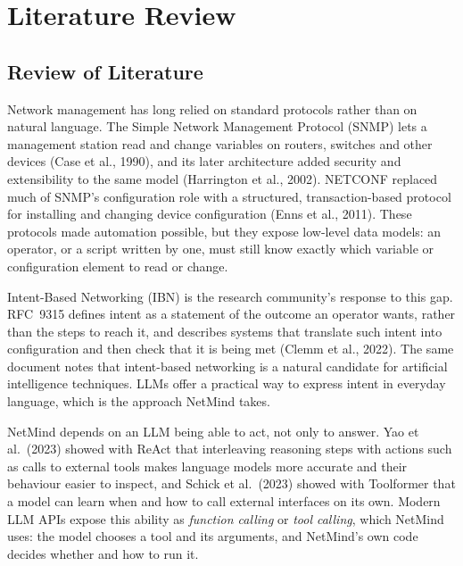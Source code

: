 \chapter{Literature Review}

\section{Review of Literature}


Network management has long relied on standard protocols rather than on
natural language. The Simple Network Management Protocol (SNMP) lets a
management station read and change variables on routers, switches and other
devices (Case et al., 1990), and its later architecture added security and
extensibility to the same model (Harrington et al., 2002). NETCONF replaced
much of SNMP's configuration role with a structured, transaction-based
protocol for installing and changing device configuration (Enns et al.,
2011). These protocols made automation possible, but they expose low-level
data models: an operator, or a script written by one, must still know
exactly which variable or configuration element to read or change.

Intent-Based Networking (IBN) is the research community's response to this
gap. RFC~9315 defines intent as a statement of the outcome an operator
wants, rather than the steps to reach it, and describes systems that
translate such intent into configuration and then check that it is being met
(Clemm et al., 2022). The same document notes that intent-based networking is
a natural candidate for artificial intelligence techniques. LLMs offer a
practical way to express intent in everyday language, which is the approach
NetMind takes.


NetMind depends on an LLM being able to act, not only to answer. Yao et al.\
(2023) showed with ReAct that interleaving reasoning steps with actions such
as calls to external tools makes language models more accurate and their
behaviour easier to inspect, and Schick et al.\ (2023) showed with Toolformer
that a model can learn when and how to call external interfaces on its own.
Modern LLM APIs expose this ability as \emph{function calling} or \emph{tool
calling}, which NetMind uses: the model chooses a tool and its arguments,
and NetMind's own code decides whether and how to run it.

